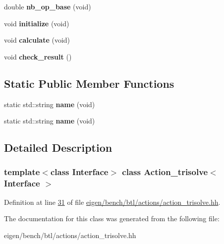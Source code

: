 \begin{DoxyCompactItemize}
\item 
\mbox{\label{class_action__trisolve_aaaf95ebe1bb7a4cd02407da30b8a3b58}} 
double {\bfseries nb\+\_\+op\+\_\+base} (void)
\item 
\mbox{\label{class_action__trisolve_ab8ee57f7968ec0179baf8bed14e11fb3}} 
void {\bfseries initialize} (void)
\item 
\mbox{\label{class_action__trisolve_a546634b95c4b3667c3941d9999c1bfee}} 
void {\bfseries calculate} (void)
\item 
\mbox{\label{class_action__trisolve_ae3b508af127fe2e99fb3f7fe5c71ad21}} 
void {\bfseries check\+\_\+result} ()
\end{DoxyCompactItemize}
\subsection*{Static Public Member Functions}
\begin{DoxyCompactItemize}
\item 
\mbox{\label{class_action__trisolve_af9ecfc6208f9383cb05135dc353fbf4e}} 
static std\+::string {\bfseries name} (void)
\item 
\mbox{\label{class_action__trisolve_af9ecfc6208f9383cb05135dc353fbf4e}} 
static std\+::string {\bfseries name} (void)
\end{DoxyCompactItemize}


\subsection{Detailed Description}
\subsubsection*{template$<$class Interface$>$\newline
class Action\+\_\+trisolve$<$ Interface $>$}



Definition at line \hyperlink{eigen_2bench_2btl_2actions_2action__trisolve_8hh_source_l00031}{31} of file \hyperlink{eigen_2bench_2btl_2actions_2action__trisolve_8hh_source}{eigen/bench/btl/actions/action\+\_\+trisolve.\+hh}.



The documentation for this class was generated from the following file\+:\begin{DoxyCompactItemize}
\item 
eigen/bench/btl/actions/action\+\_\+trisolve.\+hh\end{DoxyCompactItemize}
